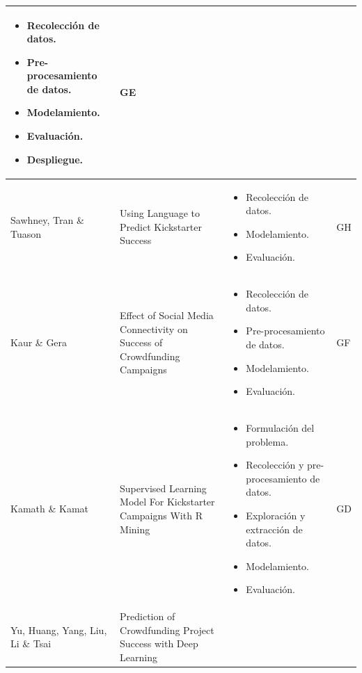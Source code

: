 \begin{longtable}{M{3cm}M{5.5cm}M{5.5cm}M{1.5cm}}
\begin{itemize}[label={--},nosep,noitemsep,leftmargin=*,topsep=0pt,partopsep=0pt]
				\item Recolección de datos.
				\item Pre-procesamiento de datos.
				\item Modelamiento.
				\item Evaluación.
				\item Despliegue.
			\end{itemize}
			& GE
			\\
			\hline
			Sawhney, Tran \& Tuason
			& Using Language to Predict Kickstarter Success
			& 
			\begin{itemize}[label={--},nosep,noitemsep,leftmargin=*,topsep=0pt,partopsep=0pt]
				\item Recolección de datos.
				\item Modelamiento.
				\item Evaluación.
			\end{itemize}
			& GH
			\\
			\hline
			Kaur \& Gera
			& Effect of Social Media Connectivity on Success of Crowdfunding Campaigns
			& 
			\begin{itemize}[label={--},nosep,noitemsep,leftmargin=*,topsep=0pt,partopsep=0pt]
				\item Recolección de datos.
				\item Pre-procesamiento de datos.
				\item Modelamiento.
				\item Evaluación.
			\end{itemize}
			& GF
			\\
			\hline
			Kamath \& Kamat
			& Supervised Learning Model For Kickstarter Campaigns With R Mining
			& 
			\begin{itemize}[label={--},nosep,noitemsep,leftmargin=*,topsep=0pt,partopsep=0pt]
				\item Formulación del problema.
				\item Recolección y pre-procesamiento de datos.
				\item Exploración y extracción de datos.
				\item Modelamiento.
				\item Evaluación.
			\end{itemize}
			& GD
			\\
			\hline
			Yu, Huang, Yang, Liu, Li \& Tsai
			& Prediction of Crowdfunding Project Success with Deep Learning
			& 
			\begin{itemize}[label={--},nosep,noitemsep,leftmargin=*,topsep=0pt,partopsep=0pt]

\end{itemize}
\end{longtable}
